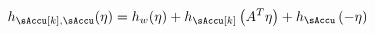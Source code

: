 \begin{itemize}
\begin{equation*}
h_{\sAccu[k],\sAccu}(\eta)=h_{w}(\eta)+h_{\sAccu[k]}\left(A^{T}\eta\right)+h_{\sAccu}\left(-\eta\right)
\end{equation*}
%
%
%

\end{itemize}
